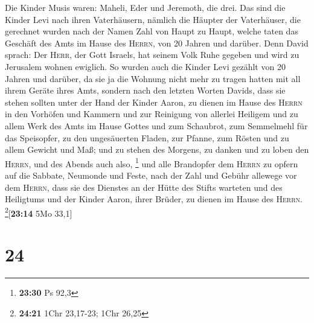  Die Kinder Musis waren: Maheli, Eder und Jeremoth, die
drei.  Das sind die Kinder Levi nach ihren Vaterhäusern,
nämlich die Häupter der Vaterhäuser, die gerechnet wurden nach der Namen
Zahl von Haupt zu Haupt, welche taten das Geschäft des Amts im Hause des
\textsc{Herrn}, von 20 Jahren und darüber.  Denn David
sprach: Der \textsc{Herr}, der Gott Israels, hat seinem Volk Ruhe
gegeben und wird zu Jerusalem wohnen ewiglich.  So wurden
auch die Kinder Levi gezählt von 20 Jahren und darüber, da sie ja die
Wohnung nicht mehr zu tragen hatten mit all ihrem Geräte ihres Amts,
 sondern nach den letzten Worten Davids, 
dass sie stehen sollten unter der Hand der Kinder Aaron, zu dienen im
Hause des \textsc{Herrn} in den Vorhöfen und Kammern und zur Reinigung
von allerlei Heiligem und zu allem Werk des Amts im Hause Gottes
 und zum Schaubrot, zum Semmelmehl für das Speisopfer, zu
den ungesäuerten Fladen, zur Pfanne, zum Rösten und zu allem Gewicht und
Maß;  und zu stehen des Morgens, zu danken und zu loben
den \textsc{Herrn}, und des Abends auch also, \footnote{\textbf{23:30}
  Ps 92,3}  und alle Brandopfer dem \textsc{Herrn} zu
opfern auf die Sabbate, Neumonde und Feste, nach der Zahl und Gebühr
allewege vor dem \textsc{Herrn},  dass sie des Dienstes
an der Hütte des Stifts warteten und des Heiligtums und der Kinder
Aaron, ihrer Brüder, zu dienen im Hause des \textsc{Herrn}.
\footnote{\textbf{24:21} 1Chr 23,17-23; 1Chr 26,25}{[}\textbf{23:14} 5Mo
33,1{]}

\hypertarget{section-23}{%
\section{24}\label{section-23}}

